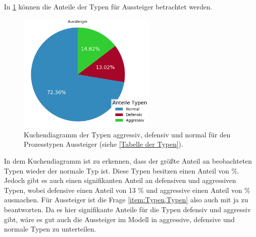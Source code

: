 In \figurename \ref{fig:AnteileTypenAussteiger} können die Anteile der Typen für Aussteiger betrachtet werden. 
\begin{figure}[H]
	\centering
		\includegraphics[width=0.6\textwidth]{pictures/data_evaluation/types/proportions_Aussteiger.png}
	\caption{Kuchendiagramm der Typen aggressiv, defensiv und normal für den Prozesstypen Aussteiger (siehe \ref{Tabelle der Typen}).}
	\label{fig:AnteileTypenAussteiger}
\end{figure}
In dem Kuchendiagramm ist zu erkennen, dass der größte Anteil an beobachteten Typen wieder der normale Typ ist. Diese Typen besitzen einen Anteil von  \%. Jedoch gibt es auch einen signifikanten Anteil an defensiven und aggressiven Typen, wobei defensive einen Anteil von 13 \% und aggressive einen Anteil von  \% ausmachen. Für Aussteiger ist die Frage \ref{item:Typen,Typen} also auch mit ja zu beantworten. Da es hier signifikante Anteile für die Typen defensiv und aggressiv gibt, wäre es gut auch die Aussteiger im Modell in aggressive, defensive und normale Typen zu unterteilen.

